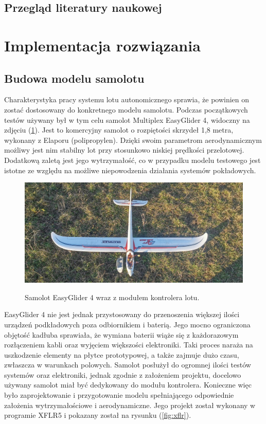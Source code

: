 \documentclass[12pt, a4paper]{article}
\let\oldref\ref
\renewcommand{\ref}[1]{(\oldref{#1})}
\begin{document}
\subsection{Przegląd literatury naukowej}
\clearpage
\section{Implementacja rozwiązania}
\subsection{Budowa modelu samolotu}
Charakterystyka pracy systemu lotu autonomicznego sprawia, że powinien  on zostać dostosowany do konkretnego modelu samolotu. Podczas początkowych testów używany był w tym celu samolot Multiplex EasyGlider 4, widoczny na zdjęciu \ref{fig:eg4}. Jest to komercyjny samolot o rozpiętości skrzydeł 1,8 metra, wykonany z Elaporu (polipropylen). Dzięki swoim parametrom aerodynamicznym możliwy jest nim stabilny lot przy stosunkowo niskiej prędkości przelotowej. Dodatkową zaletą jest jego wytrzymałość, co w przypadku modelu testowego jest istotne ze względu na możliwe niepowodzenia działania systemów pokładowych.

\begin{figure}[ht]
    \centering
    \includegraphics[width=1\textwidth]{budowa1}\\
    \caption{Samolot EasyGlider 4 wraz z modułem kontrolera lotu.}
    \label{fig:eg4}
\end{figure}

EasyGlider 4 nie jest jednak przystosowany do przenoszenia większej ilości urządzeń podkładowych poza odbiornikiem i baterią. Jego mocno ograniczona objętość kadłuba sprawiała, że wymiana baterii wiąże się z każdorazowym rozłączeniem kabli oraz wyjęciem większości elektroniki. Taki proces naraża na uszkodzenie elementy na płytce prototypowej, a także zajmuje dużo czasu, zwłaszcza w warunkach polowych. Samolot posłużył do ogromnej ilości testów systemów oraz elektroniki, jednak zgodnie z założeniem projektu, docelowo używany samolot miał być dedykowany do modułu kontrolera. Konieczne więc było zaprojektowanie i przygotowanie modelu spełniającego odpowiednie założenia wytrzymałościowe i aerodynamiczne. Jego projekt został wykonany w programie XFLR5 i pokazany został na rysunku \ref{fig:xflr}.
\end{document}

